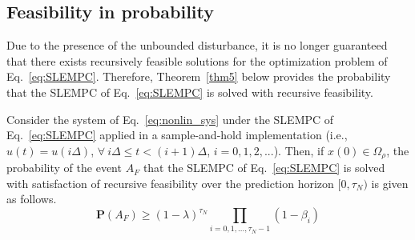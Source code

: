\documentclass[letterpaper, 10pt, conference]{ieeeconf}
\begin{document}


\subsection{Feasibility in probability}
Due to the presence of the unbounded disturbance, it is no longer guaranteed that there exists recursively feasible solutions for the optimization problem of Eq.~\ref{eq:SLEMPC}. Therefore, Theorem~\ref{thm5} below provides the probability that the SLEMPC of Eq.~\ref{eq:SLEMPC} is solved with recursive feasibility. 
\begin{thm}\label{thm5}
	Consider the system of Eq.~\ref{eq:nonlin_sys} under the SLEMPC of Eq.~\ref{eq:SLEMPC} applied in a sample-and-hold implementation (i.e., $u(t)=u(i\Delta)$, $\forall ~i \Delta \leq t < (i+1) \Delta$, $i=0,1,2,...$). Then, if $x(0) \in \Omega_{\rho}$, the probability of the event $A_F$ that the SLEMPC of Eq.~\ref{eq:SLEMPC} is solved with satisfaction of recursive feasibility over the prediction horizon $[0,\tau_{N})$ is given as follows.
	\begin{equation}
	\mathbf{P}(A_F) \geq (1- \lambda)^{\tau_{N}} \prod \limits_{i=0,1,...,\tau_{N}-1} (1-\beta_i)
	\end{equation}
\end{thm}

\hspace{0.5cm}
\end{document}
